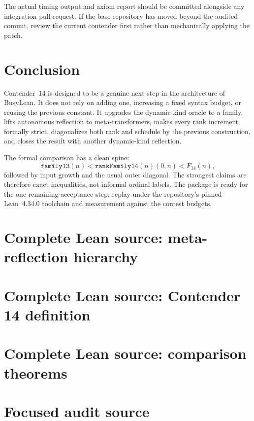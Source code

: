 \documentclass[11pt]{article}
\theoremstyle{definition}
\theoremstyle{remark}
\newcommand{\lean}[1]{\texttt{#1}}
\begin{document}
The actual timing output and axiom report should be committed alongside any
integration pull request.  If the base repository has moved beyond the audited
commit, review the current contender first rather than mechanically applying
the patch.

\section{Conclusion}

Contender~14 is designed to be a genuine next step in the architecture of
BusyLean.  It does not rely on adding one, increasing a fixed syntax budget, or
reusing the previous constant.  It upgrades the dynamic-kind oracle to a
family, lifts autonomous reflection to meta-transformers, makes every rank
increment formally strict, diagonalizes both rank and schedule by the previous
construction, and closes the result with another dynamic-kind reflection.

The formal comparison has a clean spine:
\[
  \lean{family13}(n)
  < \lean{rankFamily14}(n)(0,n)
  < F_{14}(n),
\]
followed by input growth and the usual outer diagonal.  The strongest claims
are therefore exact inequalities, not informal ordinal labels.  The package is
ready for the one remaining acceptance step: replay under the repository's
pinned Lean~4.34.0 toolchain and measurement against the contest budgets.

\appendix
\section{Complete Lean source: meta-reflection hierarchy}


\section{Complete Lean source: Contender 14 definition}


\section{Complete Lean source: comparison theorems}


\section{Focused audit source}

\end{document}
